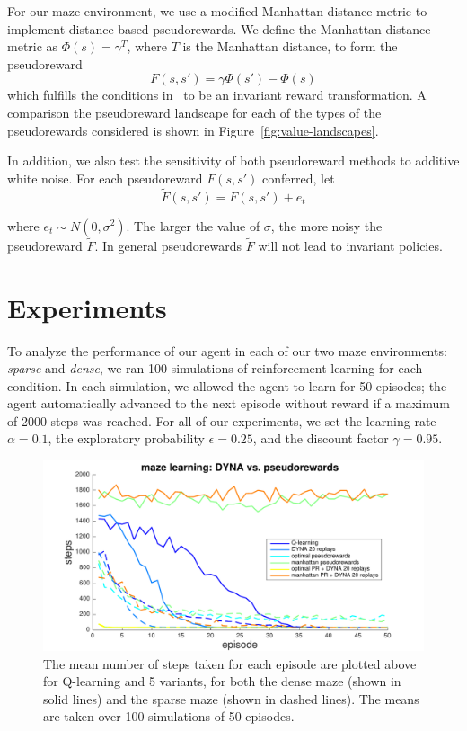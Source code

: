 \documentclass[notitlepage]{article}
\begin{document}
For our maze environment, we use a modified Manhattan distance metric to implement distance-based pseudorewards. We define the Manhattan distance metric as $\Phi(s) = \gamma^T$, where $T$ is the Manhattan distance, to form the pseudoreward
\begin{equation}
F(s, s') = \gamma \Phi(s') - \Phi(s)
\end{equation} 
which fulfills the conditions in~\cite{ng1999policy} to be an invariant reward transformation. A comparison the pseudoreward landscape for each of the types of the pseudorewards considered is shown in Figure~\ref{fig:value-landscapes}.

In addition, we also test the sensitivity of both pseudoreward methods to additive white noise. For each pseudoreward $F(s, s')$ conferred, let
\begin{equation}
\tilde{F}(s, s') = F(s, s') + e_t
\end{equation} 

\noindent where $e_t \sim N(0, \sigma^2)$. The larger the value of $\sigma$, the more noisy the pseudoreward $\tilde{F}$. In general pseudorewards $\tilde{F}$ will not lead to invariant policies.

\section*{Experiments}

To analyze the performance of our agent in each of our two maze environments: \textit{sparse} and \textit{dense}, we ran 100 simulations of reinforcement learning for each condition. In each simulation, we allowed the agent to learn for 50 episodes; the agent automatically advanced to the next episode without reward if a maximum of 2000 steps was reached. For all of our experiments, we set the learning rate $\alpha = 0.1$, the exploratory probability $\epsilon = 0.25$, and the discount factor $\gamma = 0.95$. 

\begin{figure}[ht]
\includegraphics[width=\textwidth]{modelCompareNoNoise}
\caption{The mean number of steps taken for each episode are plotted above for Q-learning and 5 variants, for both the dense maze (shown in solid lines) and the sparse maze (shown in dashed lines). The means are taken over 100 simulations of 50 episodes.}
\label{fig:model-compare}
\end{figure}
\end{document}
